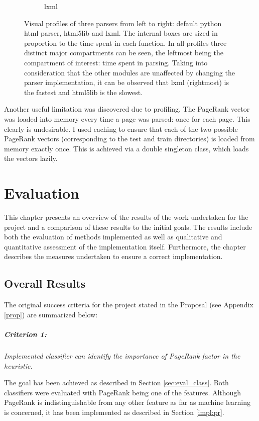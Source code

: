 \documentclass[12pt,notitlepage,twoside]{scrreprt}
\begin{document}
\begin{figure}[h!]
\begin{subfigure}[b]{.3\textwidth}
  \caption{lxml}
  \label{lxml}
\end{subfigure}
\caption{Visual profiles of three parsers from left to right: default python
html parser, html5lib and lxml. The internal boxes are sized in proportion to
the time spent in each function. In all profiles three distinct major
compartments can be seen, the leftmost being the compartment of interest: 
time spent in parsing. Taking into consideration that the other modules are unaffected by changing the parser
implementation, it can be observed that lxml (rightmost) is the fastest and
html5lib is the slowest.\label{parsers}}
\end{figure}

Another useful limitation was discovered due to profiling. The PageRank vector
was loaded into memory every time a page was parsed: once for each page. This
clearly is undesirable. I used caching to ensure that each of the two possible
PageRank vectors (corresponding to the test and train directories) is loaded
from memory exactly once. This is achieved via a double singleton class, which
loads the vectors lazily.

\cleardoublepage

\chapter{Evaluation}
This chapter presents an overview of the results of the work undertaken for the project
and a comparison of these results to the initial goals.  The results include both the
evaluation of methods implemented as well as qualitative and quantitative assessment of
the implementation itself. Furthermore, the chapter describes the measures undertaken to
ensure a correct implementation.

\section{Overall Results}
The original success criteria for the project stated in the Proposal (see Appendix
\ref{prop}) are summarized below:

\paragraph{Criterion 1:}\textit{Implemented classifier can identify the importance of
PageRank factor in the heuristic.}

The goal has been achieved as described in Section \ref{sec:eval_class}. Both classifiers were
evaluated with PageRank being one of the features. Although PageRank is indistinguishable
from any other feature as far as machine learning is concerned, it has been implemented as
described in Section \ref{impl:pr}.
\end{document}
